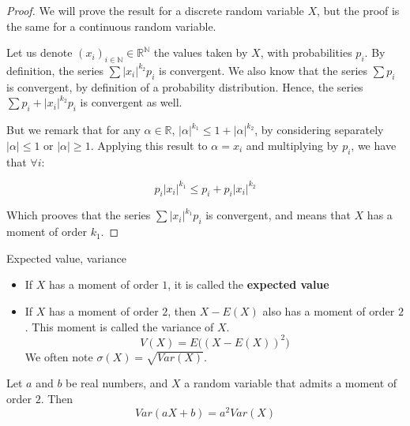 \documentclass[
10pt, %
a4paper, %
oneside, %
headinclude,footinclude, %
BCOR5mm, %
]{scrartcl}
\begin{document}
\begin{proof}
    We will prove the result for a discrete random variable $X$, but the proof is the same for a continuous random variable.

    Let us denote $(x_i)_{i\in \mathbb{N}}\in \mathbb{R}^{\mathbb{N}}$ the values taken by $X$, with probabilities $p_i$. By definition, the series $\sum |x_i|^{k_2}p_i$ is convergent. We also know that the series $\sum p_i$ is convergent, by definition of a probability distribution. Hence, the series $\sum p_i+ |x_i|^{k_2}p_i$ is convergent as well.

    But we remark that for any $\alpha\in \mathbb{R}$, $|\alpha|^{k_1}\leq 1 + |\alpha|^{k_2}$, by considering separately $|\alpha|\leq 1$ or $|\alpha|\geq 1$. Applying this result to $\alpha=x_i$ and multiplying by $p_i$, we have that $\forall i$:

    \begin{equation}
	p_i|x_i|^{k_1}\leq p_i+p_i|x_i|^{k_2}
    \end{equation}

    Which prooves that the series $\sum |x_i|^{k_1}p_i$ is convergent, and means that $X$ has a moment of order $k_1$.
\end{proof}

\begin{definition}{Expected value, variance}

    \begin{itemize}
        \item If $X$ has a moment of order $1$, it is called the \textbf{{expected value}} 
	\item If $X$ has a moment of order $2$, then $X-E(X)$ also has a moment of order $2$. This moment is called the variance of $X$.
	    \begin{equation}
		V(X)=E\big((X-E(X))^2\big)
	    \end{equation}
	    We often note $\sigma(X)= \sqrt{Var(X)}$. 
    \end{itemize}

\end{definition}

\begin{proposition}
    \label{prop:var}

    Let $a$ and $b$ be real numbers, and $X$ a random variable that admits a moment of order $2$. Then
    \begin{equation}
	Var(aX+b)=a^2Var(X)
    \end{equation}

\end{proposition}
\end{document}

